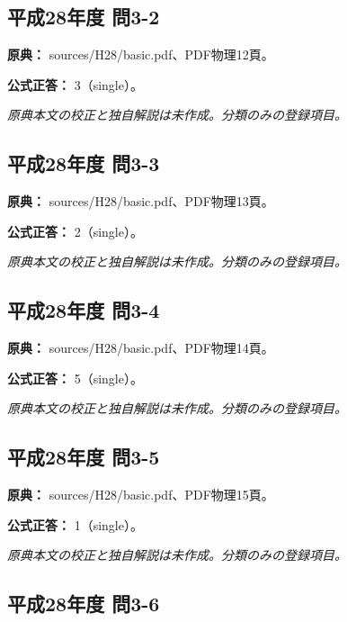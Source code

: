 \subsection{平成28年度 問3-2}
\label{q:h28-reg-basic-3-2}

\noindent\textbf{原典：} sources/H28/basic.pdf、PDF物理12頁。

\textbf{公式正答：} 3（single）。

\par\textit{原典本文の校正と独自解説は未作成。分類のみの登録項目。}

\subsection{平成28年度 問3-3}
\label{q:h28-reg-basic-3-3}

\noindent\textbf{原典：} sources/H28/basic.pdf、PDF物理13頁。

\textbf{公式正答：} 2（single）。

\par\textit{原典本文の校正と独自解説は未作成。分類のみの登録項目。}

\subsection{平成28年度 問3-4}
\label{q:h28-reg-basic-3-4}

\noindent\textbf{原典：} sources/H28/basic.pdf、PDF物理14頁。

\textbf{公式正答：} 5（single）。

\par\textit{原典本文の校正と独自解説は未作成。分類のみの登録項目。}

\subsection{平成28年度 問3-5}
\label{q:h28-reg-basic-3-5}

\noindent\textbf{原典：} sources/H28/basic.pdf、PDF物理15頁。

\textbf{公式正答：} 1（single）。

\par\textit{原典本文の校正と独自解説は未作成。分類のみの登録項目。}

\subsection{平成28年度 問3-6}
\label{q:h28-reg-basic-3-6}

